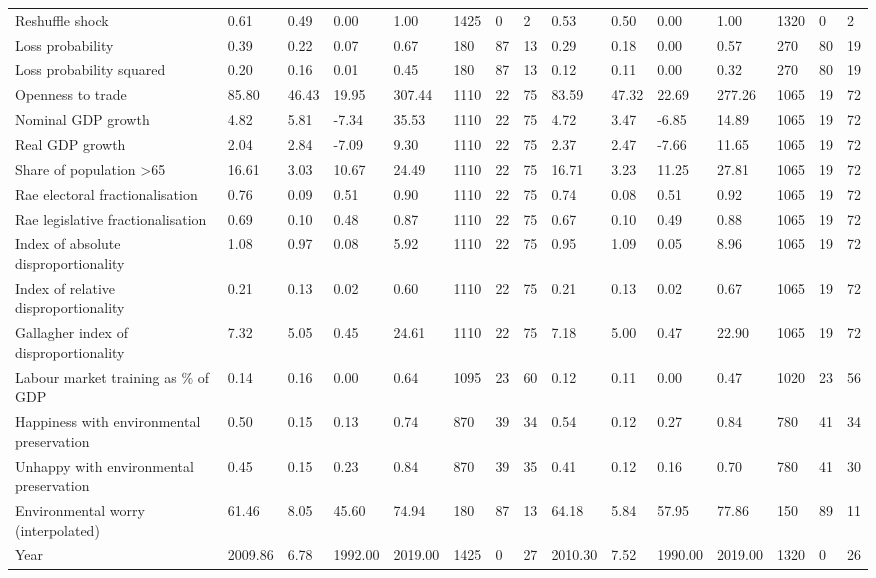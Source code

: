 \begin{longtable}{lllllllllllllll}
\addlinespace
Reshuffle shock & 0.61 & 0.49 & 0.00 & 1.00 & 1425 & 0 & 2 & 0.53 & 0.50 & 0.00 & 1.00 & 1320 & 0 & 2\\
Loss probability & 0.39 & 0.22 & 0.07 & 0.67 & 180 & 87 & 13 & 0.29 & 0.18 & 0.00 & 0.57 & 270 & 80 & 19\\
Loss probability squared & 0.20 & 0.16 & 0.01 & 0.45 & 180 & 87 & 13 & 0.12 & 0.11 & 0.00 & 0.32 & 270 & 80 & 19\\
Openness to trade & 85.80 & 46.43 & 19.95 & 307.44 & 1110 & 22 & 75 & 83.59 & 47.32 & 22.69 & 277.26 & 1065 & 19 & 72\\
Nominal GDP growth & 4.82 & 5.81 & -7.34 & 35.53 & 1110 & 22 & 75 & 4.72 & 3.47 & -6.85 & 14.89 & 1065 & 19 & 72\\
\addlinespace
Real GDP growth & 2.04 & 2.84 & -7.09 & 9.30 & 1110 & 22 & 75 & 2.37 & 2.47 & -7.66 & 11.65 & 1065 & 19 & 72\\
Share of population >65 & 16.61 & 3.03 & 10.67 & 24.49 & 1110 & 22 & 75 & 16.71 & 3.23 & 11.25 & 27.81 & 1065 & 19 & 72\\
Rae electoral fractionalisation & 0.76 & 0.09 & 0.51 & 0.90 & 1110 & 22 & 75 & 0.74 & 0.08 & 0.51 & 0.92 & 1065 & 19 & 72\\
Rae legislative fractionalisation & 0.69 & 0.10 & 0.48 & 0.87 & 1110 & 22 & 75 & 0.67 & 0.10 & 0.49 & 0.88 & 1065 & 19 & 72\\
Index of absolute disproportionality & 1.08 & 0.97 & 0.08 & 5.92 & 1110 & 22 & 75 & 0.95 & 1.09 & 0.05 & 8.96 & 1065 & 19 & 72\\
\addlinespace
Index of relative disproportionality & 0.21 & 0.13 & 0.02 & 0.60 & 1110 & 22 & 75 & 0.21 & 0.13 & 0.02 & 0.67 & 1065 & 19 & 72\\
Gallagher index of disproportionality & 7.32 & 5.05 & 0.45 & 24.61 & 1110 & 22 & 75 & 7.18 & 5.00 & 0.47 & 22.90 & 1065 & 19 & 72\\
Labour market training as \% of GDP & 0.14 & 0.16 & 0.00 & 0.64 & 1095 & 23 & 60 & 0.12 & 0.11 & 0.00 & 0.47 & 1020 & 23 & 56\\
Happiness with environmental preservation & 0.50 & 0.15 & 0.13 & 0.74 & 870 & 39 & 34 & 0.54 & 0.12 & 0.27 & 0.84 & 780 & 41 & 34\\
Unhappy with environmental preservation & 0.45 & 0.15 & 0.23 & 0.84 & 870 & 39 & 35 & 0.41 & 0.12 & 0.16 & 0.70 & 780 & 41 & 30\\
\addlinespace
Environmental worry (interpolated) & 61.46 & 8.05 & 45.60 & 74.94 & 180 & 87 & 13 & 64.18 & 5.84 & 57.95 & 77.86 & 150 & 89 & 11\\
Year & 2009.86 & 6.78 & 1992.00 & 2019.00 & 1425 & 0 & 27 & 2010.30 & 7.52 & 1990.00 & 2019.00 & 1320 & 0 & 26\\
\bottomrule
\end{longtable}
